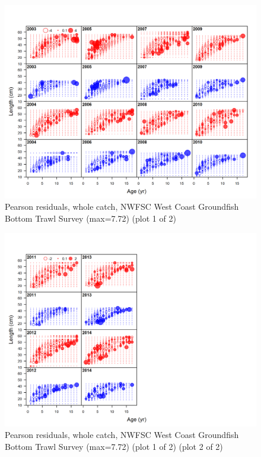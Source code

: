 \documentclass[12pt,]{article}
\begin{document}
\begin{figure}
\centering
\includegraphics{r4ss/plots_mod1/comp_condAALfit_residsflt7mkt0_page1.png}
\caption{Pearson residuals, whole catch, NWFSC West Coast Groundfish
Bottom Trawl Survey (max=7.72) (plot 1 of 2)
\label{fig:nwfsc_combo_pearson_1}}
\end{figure}

\begin{figure}
\centering
\includegraphics{r4ss/plots_mod1/comp_condAALfit_residsflt7mkt0_page2.png}
\caption{Pearson residuals, whole catch, NWFSC West Coast Groundfish
Bottom Trawl Survey (max=7.72) (plot 1 of 2) (plot 2 of 2)
\label{fig:nwfsc_combo_pearson_2}}
\end{figure}
\end{document}
